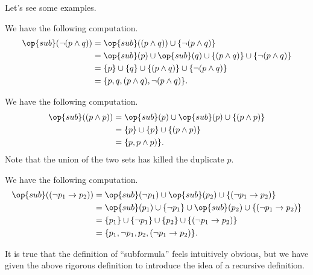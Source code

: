 Let's see some examples.
\begin{example}
	We have the following computation.
	\begin{align*}
		\op{sub}(\lnot(p\land q)) &= \op{sub}((p\land q)) \cup \{\lnot(p\land q)\} \\
		&= \op{sub}(p)\cup\op{sub}(q)\cup\{(p\land q)\} \cup \{\lnot(p\land q)\} \\
		&= \{p\}\cup\{q\}\cup\{(p\land q)\} \cup \{\lnot(p\land q)\} \\
		&= \{p,q,(p\land q),\lnot(p\land q)\}.
	\end{align*}
\end{example}
\begin{example}
	We have the following computation.
	\begin{align*}
		\op{sub}((p\land p)) &= \op{sub}(p)\cup\op{sub}(p)\cup\{(p\land p)\} \\
		&= \{p\}\cup\{p\}\cup\{(p\land p)\} \\
		&= \{p,p\land p)\}.
	\end{align*}
	Note that the union of the two sets has killed the duplicate $p$.
\end{example}
\begin{example}
	We have the following computation.
	\begin{align*}
		\op{sub}((\lnot p_1\to p_2)) &= \op{sub}(\lnot p_1)\cup\op{sub}(p_2)\cup\{(\lnot p_1\to p_2)\} \\
		&= \op{sub}(p_1)\cup\{\lnot p_1\}\cup\op{sub}(p_2)\cup\{(\lnot p_1\to p_2)\} \\
		&= \{p_1\}\cup\{\lnot p_1\}\cup\{p_2\}\cup\{(\lnot p_1\to p_2)\} \\
		&= \{p_1,\lnot p_1,p_2,(\lnot p_1\to p_2)\}.
	\end{align*}
\end{example}
It is true that the definition of ``subformula'' feels intuitively obvious, but we have given the above rigorous definition to introduce the idea of a recursive definition.

